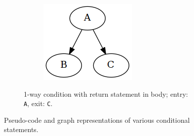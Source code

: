 \begin{figure}[htbp]
\begin{subfigure}[ht]{0.30\textwidth}
\begin{subfigure}[ht]{0.45\textwidth}
		\end{subfigure}
		\begin{subfigure}[ht]{0.50\textwidth}
			\includegraphics[width=\textwidth]{inc/primitives/if_return.png}
		\end{subfigure}
		\caption{1-way condition with return statement in body; entry: \texttt{A}, exit: \texttt{C}.}
	\end{subfigure}
	\caption{Pseudo-code and graph representations of various conditional statements.}
\end{figure}

